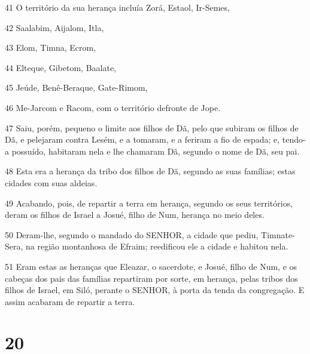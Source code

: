 \par 41 O território da sua herança incluía Zorá, Estaol, Ir-Semes,
\par 42 Saalabim, Aijalom, Itla,
\par 43 Elom, Timna, Ecrom,
\par 44 Elteque, Gibetom, Baalate,
\par 45 Jeúde, Benê-Beraque, Gate-Rimom,
\par 46 Me-Jarcom e Racom, com o território defronte de Jope.
\par 47 Saiu, porém, pequeno o limite aos filhos de Dã, pelo que subiram os filhos de Dã, e pelejaram contra Lesém, e a tomaram, e a feriram a fio de espada; e, tendo-a possuído, habitaram nela e lhe chamaram Dã, segundo o nome de Dã, seu pai.
\par 48 Esta era a herança da tribo dos filhos de Dã, segundo as suas famílias; estas cidades com suas aldeias.
\par 49 Acabando, pois, de repartir a terra em herança, segundo os seus territórios, deram os filhos de Israel a Josué, filho de Num, herança no meio deles.
\par 50 Deram-lhe, segundo o mandado do SENHOR, a cidade que pediu, Timnate-Sera, na região montanhosa de Efraim; reedificou ele a cidade e habitou nela.
\par 51 Eram estas as heranças que Eleazar, o sacerdote, e Josué, filho de Num, e os cabeças dos pais das famílias repartiram por sorte, em herança, pelas tribos dos filhos de Israel, em Siló, perante o SENHOR, à porta da tenda da congregação. E assim acabaram de repartir a terra.

\chapter{20}

